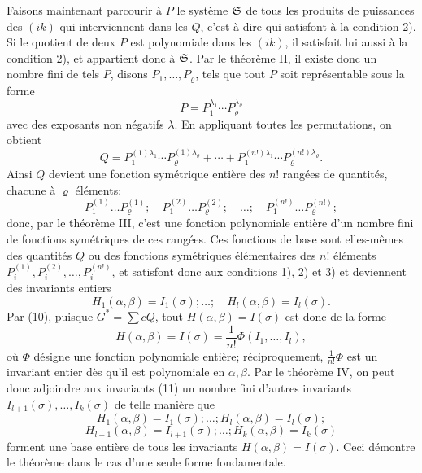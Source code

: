 Faisons maintenant parcourir à $P$ le système $\mathfrak S$ de tous les produits de puissances des $(ik)$ qui interviennent dans les $Q$, c'est-à-dire qui satisfont à la condition 2). Si le quotient de deux $P$ est polynomiale dans les $(ik)$, il satisfait lui aussi à la condition 2), et appartient donc à $\mathfrak S$. Par le théorème II, il existe donc un nombre fini de tels $P$, disons $P_1,\ldots,P_\varrho$, tels que tout $P$ soit représentable sous la forme
\[
        P=P_1^{\lambda_1}\cdots P_\varrho^{\lambda_\varrho}
\]
avec des exposants non négatifs $\lambda$. En appliquant toutes les permutations, on obtient
\[
        Q=
        P_1^{(1)\lambda_1}\cdots P_\varrho^{(1)\lambda_\varrho}
        +\cdots+
        P_1^{(n!)\lambda_1}\cdots P_\varrho^{(n!)\lambda_\varrho}.
\]
Ainsi $Q$ devient une fonction symétrique entière des $n!$ rangées de quantités, chacune à $\varrho$ éléments:
\[
        P_1^{(1)}\ldots P_\varrho^{(1)};
        \quad
        P_1^{(2)}\ldots P_\varrho^{(2)};
        \quad \ldots;\quad
        P_1^{(n!)}\ldots P_\varrho^{(n!)};
\]
donc, par le théorème III, c'est une fonction polynomiale entière d'un nombre fini de fonctions symétriques de ces rangées. Ces fonctions de base sont elles-mêmes des quantités $Q$ ou des fonctions symétriques élémentaires des $n!$ éléments $P_i^{(1)},P_i^{(2)},\ldots,P_i^{(n!)}$, et satisfont donc aux conditions 1), 2) et 3) et deviennent des invariants entiers
\begin{equation}
        H_1(\alpha,\beta)=I_1(\sigma);\ldots;\quad
        H_l(\alpha,\beta)=I_l(\sigma).
\end{equation}
Par (10), puisque $G^*=\sum cQ$, tout $H(\alpha,\beta)=I(\sigma)$ est donc de la forme
\[
        H(\alpha,\beta)=I(\sigma)=\frac1{n!}\Phi(I_1,\ldots,I_l),
\]
où $\Phi$ désigne une fonction polynomiale entière; réciproquement, $\frac1{n!}\Phi$ est un invariant entier dès qu'il est polynomiale en $\alpha,\beta$. Par le théorème IV, on peut donc adjoindre aux invariants (11) un nombre fini d'autres invariants $I_{l+1}(\sigma),\ldots,I_k(\sigma)$ de telle manière que
\[
        H_1(\alpha,\beta)=I_1(\sigma);\ldots;H_l(\alpha,\beta)=I_l(\sigma);
\]
\[
        H_{l+1}(\alpha,\beta)=I_{l+1}(\sigma);\ldots;H_k(\alpha,\beta)=I_k(\sigma)
\]
forment une base entière de tous les invariants $H(\alpha,\beta)=I(\sigma)$. Ceci démontre le théorème dans le cas d'une seule forme fondamentale.

